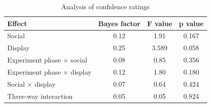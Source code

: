 \documentclass[doc, a4paper, apacite]{apa6}
\begin{document}
\begin{table}
	\centering
	\caption{Analysis of confidence ratings}
	\label{table:confidenceAnalysis}
	\begin{tabular}{l c c c}
		\toprule
		Effect & Bayes factor & F value & p value \\
		\midrule
		Social & 0.12 & 1.91 & 0.167 \\
		Display & 0.25 & 3.589 & 0.058 \\
		Experiment phase $\times$ social & 0.08 & 0.85 & 0.356 \\
		Experiment phase $\times$ display & 0.12 & 1.80 & 0.180 \\
		Social $\times$ display & 0.07 & 0.64 & 0.424 \\
		Three-way interaction & 0.05 & 0.05 & 0.824 \\
		\bottomrule
	\end{tabular}
\end{table}

\clearpage
\newpage


\end{document}

